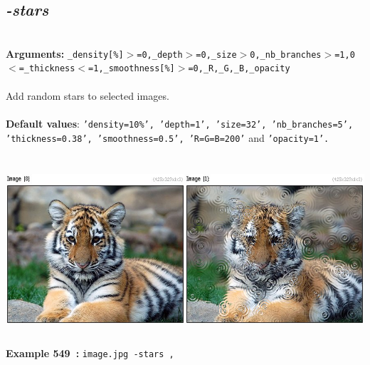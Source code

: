 \documentclass[a4paper,11pt,twoside]{book}
\begin{document}
\subsection{\emph{-stars} }\vspace*{-0.5em}
~\\\textbf{Arguments: } 
{\small \texttt{\_density[\%]$>$=0,\_depth$>$=0,\_size$>$0,\_nb\_branches$>$=1,0$<$=\_thickness$<$=1,\_smoothness[\%]$>$=0,\_R,\_G,\_B,\_opacity}}\\~\\
Add random stars to selected images.
~\\~\\\textbf{Default values}: {\small \texttt{'density=10\%', 'depth=1', 'size=32', 'nb\_branches=5', 'thickness=0.38', 'smoothness=0.5', 'R=G=B=200'} and \texttt{'opacity=1'.}}
\begin{center}\includegraphics[keepaspectratio=true,height=7cm,width=\textwidth]{img/gmic_def549.jpg}\\
{\footnotesize \textbf{Example 549~:} \texttt{image.jpg -stars ,}}
\end{center}
\end{document}
